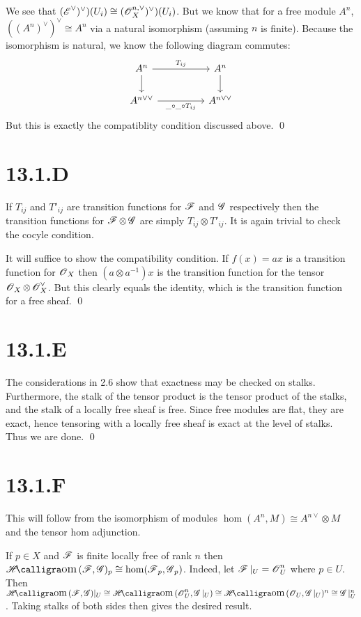 \documentclass{article}
\begin{document}
We see that $(\operatorname{\mathscr{E}}^\vee)^\vee)(U_i) \cong (\operatorname{\mathscr{O}}_X^{n,\vee})^\vee)(U_i)$. But we know that for a free module
$A^n$, $((A^n)^\vee)^\vee \cong A^n$ via a natural isomorphism
(assuming $n$ is finite). Because the isomorphism is
natural, we know the following diagram commutes: \[\begin{tikzcd}
        {A^n} &  & {A^n} \\{A^{n\vee\vee}} &  & {A^{n\vee\vee}}
        \arrow[from=1-1, to=2-1]
        \arrow[from=1-3, to=2-3]
        \arrow["{T_{ij}}", from=1-1, to=1-3]
        \arrow["{ \_ \circ \_ \circ T_{ij}}"', from=2-1, to=2-3]
    \end{tikzcd}\] But
this is exactly the compatiblity condition discussed above. \qed

\section{13.1.D}
If $T_{ij}$ and $T'_{ij}$ are transition functions
for $\operatorname{\mathscr{F}}$ and $\operatorname{\mathscr{G}}$ respectively then the
transition functions for $\operatorname{\mathscr{F}} \otimes \operatorname{\mathscr{G}}$ are simply
$T_{ij}\otimes T'_{ij}$. It is again trivial to check the cocyle condition.

It will suffice to show the compatibility condition. If $f(x)=ax$
is a transition function for $\operatorname{\mathscr{O}}_X$ then
$(a \otimes a^{-1})x$ is the transition function for the tensor
$\operatorname{\mathscr{O}}_X \otimes \operatorname{\mathscr{O}}_X^\vee$. But this clearly equals the identity, which is the
transition function for a free sheaf. \qed

\section{13.1.E}
The considerations in 2.6 show that exactness may be checked on stalks.
Furthermore, the stalk of the tensor product is the tensor product of the
stalks, and the stalk of a locally free sheaf is free. Since free modules are
flat, they are exact, hence tensoring with a locally free sheaf is exact at the
level of stalks. Thus we are done. \qed

\section{13.1.F}
This will follow from the isomorphism of modules $\hom(A^n, M) \cong A^{n\vee} \otimes M$ and
the tensor hom adjunction.

If $p \in X$ and $\operatorname{\mathscr{F}}$ is finite locally free
of rank $n$ then $\Hom(\Fsh, \Gsh)_p \cong \hom(\Fsh_p, \Gsh_p)$. Indeed, let
$\operatorname{\mathscr{F}}|_U=\operatorname{\mathscr{O}}_U^n$ where $p \in U$. Then
$\Hom(\Fsh, \Gsh)|_U \cong \Hom(\Osh_U^n, \Gsh|_U)\cong
    \Hom(\Osh_U, \Gsh|_U)^n\cong \Gsh|_U^n$. Taking stalks of both sides then gives the desired
result.
\end{document}

